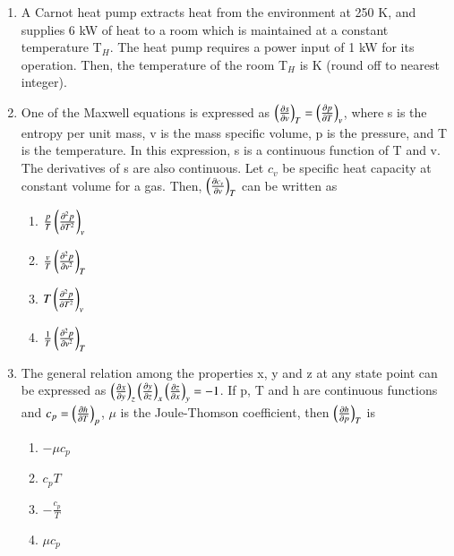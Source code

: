 \documentclass[a4paper,10pt]{article}
\begin{document}
\begin{enumerate}
\hfill{}

\item A Carnot heat pump extracts heat from the environment at 250 K, and supplies 6 kW of heat to a room which is maintained at a constant temperature T$_H$. The heat pump requires a power input of 1 kW for its operation. Then, the temperature of the room T$_H$ is \underline{\hspace{2cm}} K (round off to nearest integer).

\hfill{}

\item One of the Maxwell equations is expressed as $\left(\frac{\partial s}{\partial v}\right)_T = \left(\frac{\partial p}{\partial T}\right)_v$, where s is the entropy per unit mass, v is the mass specific volume, p is the pressure, and T is the temperature. In this expression, s is a continuous function of T and v. The derivatives of s are also continuous. Let $c_v$ be specific heat capacity at constant volume for a gas. Then, $\left(\frac{\partial c_v}{\partial v}\right)_T$ can be written as

\hfill{}
\begin{enumerate}
    \item $\frac{p}{T}\left(\frac{\partial^2 p}{\partial T^2}\right)_v$
    \item $\frac{v}{T}\left(\frac{\partial^2 p}{\partial v^2}\right)_T$
    \item $T\left(\frac{\partial^2 p}{\partial T^2}\right)_v$
    \item $\frac{1}{T}\left(\frac{\partial^2 p}{\partial v^2}\right)_T$
\end{enumerate}

\item The general relation among the properties x, y and z at any state point can be expressed as $\left(\frac{\partial x}{\partial y}\right)_z \left(\frac{\partial y}{\partial z}\right)_x \left(\frac{\partial z}{\partial x}\right)_y = -1$. If p, T and h are continuous functions and $c_p = \left(\frac{\partial h}{\partial T}\right)_p$, $\mu$ is the Joule-Thomson coefficient, then $\left(\frac{\partial h}{\partial p}\right)_T$ is

\hfill{}
\begin{enumerate}
    \item $-\mu c_p$
    \item $c_p T$
    \item $-\frac{c_p}{T}$
    \item $\mu c_p$
\end{enumerate}


\end{enumerate}
\end{document}
